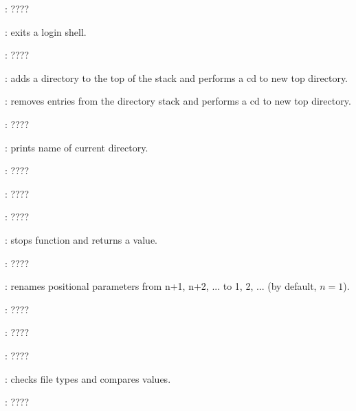 \begin{compactenum}
\item [\symbolbash] : \dotfill ????

\item [\symbolbash] : exits a login shell.

\item [\symbolbash] : \dotfill ????

\item [\symbolbash] : adds a directory to the top of the stack and performs a cd to new top directory.
\item [\symbolbash] : removes entries from the directory stack and performs a cd to new top directory.

\item [\symbolbash] : \dotfill ????

\item [\symbolbash] : prints name of current directory.

\item [\symbolbash] : \dotfill ????

\item [\symbolbash] : \dotfill ????

\item [\symbolbash] : \dotfill ????

\item [\symbolbash] : stops function and returns a value.

\item [\symbolbash] : \dotfill ????

\item [\symbolbash] : renames positional parameters from n+1, n+2, ... to 1, 2, ... (by default, $n = 1$).

\item [\symbolbash] : \dotfill ????

\item [\symbolbash] : \dotfill ????

\item [\symbolbash] : \dotfill ????

\item [\symbolbash] : checks file types and compares values.

\item [\symbolbash] : \dotfill ????


\end{compactenum}
